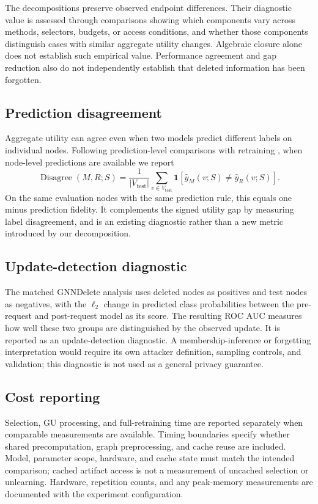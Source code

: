 The decompositions preserve observed endpoint differences. Their diagnostic value is assessed through comparisons showing which components vary across methods, selectors, budgets, or access conditions, and whether those components distinguish cases with similar aggregate utility changes. Algebraic closure alone does not establish such empirical value. Performance agreement and gap reduction also do not independently establish that deleted information has been forgotten.

\subsection{Prediction disagreement}
\label{app:prediction-disagreement}
Aggregate utility can agree even when two models predict different labels on individual nodes. Following prediction-level comparisons with retraining \citep{jain2026practice}, when node-level predictions are available we report
\begin{equation}
\operatorname{Disagree}(M,R;S)
=\frac{1}{|V_{\mathrm{test}}|}
\sum_{v\in V_{\mathrm{test}}}
\mathbf 1[\hat y_M(v;S)\ne\hat y_R(v;S)].
\end{equation}
On the same evaluation nodes with the same prediction rule, this equals one minus prediction fidelity. It complements the signed utility gap by measuring label disagreement, and is an existing diagnostic rather than a new metric introduced by our decomposition.

\subsection{Update-detection diagnostic}
\label{app:update-detection}
The matched GNNDelete analysis uses deleted nodes as positives and test nodes as negatives, with the $\ell_2$ change in predicted class probabilities between the pre-request and post-request model as its score. The resulting ROC AUC measures how well these two groups are distinguished by the observed update. It is reported as an update-detection diagnostic. A membership-inference or forgetting interpretation would require its own attacker definition, sampling controls, and validation; this diagnostic is not used as a general privacy guarantee.

\subsection{Cost reporting}
\label{app:evaluation-cost}
Selection, GU processing, and full-retraining time are reported separately when comparable measurements are available. Timing boundaries specify whether shared precomputation, graph preprocessing, and cache reuse are included. Model, parameter scope, hardware, and cache state must match the intended comparison; cached artifact access is not a measurement of uncached selection or unlearning. Hardware, repetition counts, and any peak-memory measurements are documented with the experiment configuration.

